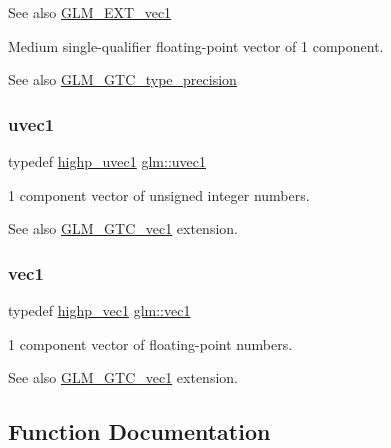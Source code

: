 \begin{DoxySeeAlso}{See also}
\hyperlink{group__ext__vec1}{G\+L\+M\+\_\+\+E\+X\+T\+\_\+vec1}
\end{DoxySeeAlso}
Medium single-\/qualifier floating-\/point vector of 1 component. \begin{DoxySeeAlso}{See also}
\hyperlink{group__gtc__type__precision}{G\+L\+M\+\_\+\+G\+T\+C\+\_\+type\+\_\+precision} 
\end{DoxySeeAlso}
\mbox{\label{group__ext__vec1_ga4e12bc23a3d060164eef452f81d92a03}} 
\subsubsection{\texorpdfstring{uvec1}{uvec1}}
{\footnotesize\ttfamily typedef \hyperlink{group__ext__vec1_ga4e92a1105fa908e8a96971602381e381}{highp\+\_\+uvec1} \hyperlink{group__ext__vec1_ga4e12bc23a3d060164eef452f81d92a03}{glm\+::uvec1}}

1 component vector of unsigned integer numbers. \begin{DoxySeeAlso}{See also}
\hyperlink{group__gtc__vec1}{G\+L\+M\+\_\+\+G\+T\+C\+\_\+vec1} extension. 
\end{DoxySeeAlso}
\mbox{\label{group__ext__vec1_ga16030dae9029ed1eab1553a2183bbb79}} 
\subsubsection{\texorpdfstring{vec1}{vec1}}
{\footnotesize\ttfamily typedef \hyperlink{group__ext__vec1_gad8ebf6f2ad36cc3167e77f82b4ae9390}{highp\+\_\+vec1} \hyperlink{group__ext__vec1_ga16030dae9029ed1eab1553a2183bbb79}{glm\+::vec1}}

1 component vector of floating-\/point numbers. \begin{DoxySeeAlso}{See also}
\hyperlink{group__gtc__vec1}{G\+L\+M\+\_\+\+G\+T\+C\+\_\+vec1} extension. 
\end{DoxySeeAlso}


\subsection{Function Documentation}
\mbox{\label{group__ext__vec1_ga62a75b0dadc3e908b03bf03bee891e6d}} 
